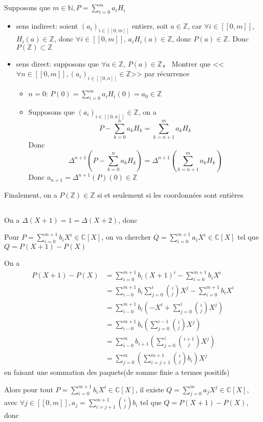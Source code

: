 \documentclass[a4paper,12pt]{book}
\begin{document}

\subsection{}
Supposons que $m \in \mathbb{N}, P=\sum_{i=0}^m a_iH_i$
\begin{itemize}
    
    \item sens indirect: soient $(a_i)_{i \in [\![0,m]\!]}$ entiers, soit $a \in \mathbb{Z}$, car $\forall i  \in [\![0,m]\!]$, $H_i(a) \in \mathbb{Z}$, 
    donc $\forall i  \in [\![0,m]\!]$, $a_iH_i(a) \in \mathbb{Z}$, donc $P(a) \in \mathbb{Z}$. Donc $P(\mathbb{Z}) \subset \mathbb{Z}$
    \item sens direct: supposons que $\forall a \in \mathbb{Z}$, $P(a) \in \mathbb{Z}$， Montrer que <<$\forall n \in [\![0,m]\!], (a_i)_{i \in [\![0,n]\!]}\in \mathbb{Z}$>> par récurrence
    \begin{itemize}
        \item $n=0$: $P(0)=\sum_{i=0}^m a_iH_i(0)=a_0 \in \mathbb{Z}$
        \item Supposons que $(a_i)_{i \in [\![0,n]\!]}\in \mathbb{Z}$, 
        on a 
        $$
        P-\sum_{k=0}^na_kH_k=\sum_{k=n+1}^ma_kH_k
        $$
        Donc 
        $$
        \Delta^{n+1}\left(P-\sum_{k=0}^na_kH_k\right)=\Delta^{n+1}\left(\sum_{k=n+1}^ma_kH_k\right)
        $$
        Donc $a_{n+1}=\Delta^{n+1}(P)(0) \in \mathbb{Z}$
    \end{itemize}
\end{itemize}
Finalement, on a $P(\mathbb{Z}) \in \mathbb{Z}$ si et seulement si les coordonnées sont entières

\subsection{}
On a $\Delta(X+1)=1=\Delta(X+2)$, donc 

Pour $P=\sum_{i=0}^{m+1}b_iX^i \in \mathbb{C}[X]$, on va chercher $Q=\sum_{i=0}^{m+1}a_iX^i \in \mathbb{C}[X]$ tel que $Q=P(X+1)-P(X)$

On a 
\begin{align*}
    P(X+1)-P(X)&=\sum_{i=0}^{m+1}b_i(X+1)^i-\sum_{i=0}^{m+1}b_iX^i\\
    &=\sum_{i-0}^{m+1}b_i\sum_{j=0}^i\binom{i}{j}X^j-\sum_{i=0}^{m+1}b_iX^i\\
    &=\sum_{i-0}^{m+1}b_i\left(-X^i+\sum_{j=0}^i\binom{i}{j}X^j\right)\\
    &=\sum_{i-0}^{m+1}b_i\left(\sum_{j=0}^{i-1}\binom{i}{j}X^j\right)\\
    &=\sum_{i-0}^{m}b_{i+1}\left(\sum_{j=0}^i\binom{i+1}{j}X^j\right)\\
    &=\sum_{j=0}^m\left(\sum_{i=j+1}^{m+1}\binom{i}{j}b_i\right)X^j
\end{align*}
en faisant une sommation des paquets(de somme finie a termes positifs)

Alors pour tout $ P=\sum_{i=0}^{m+1}b_iX^i \in \mathbb{C}[X]$, il existe $Q=\sum_{j=0}^{m}a_jX^j \in \mathbb{C}[X]$, avec 
$\forall j \in [\![0,m]\!], a_j=\sum_{i=j+1}^{m+1}\binom{i}{j}b_i$ tel que $Q=P(X+1)-P(X)$, donc 

 
\end{document}
